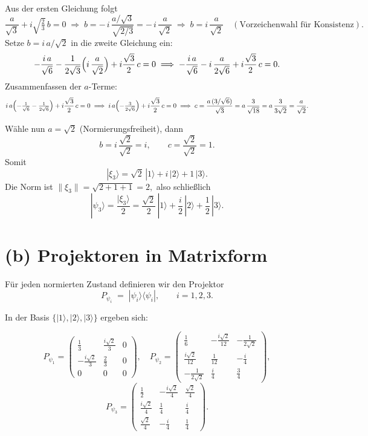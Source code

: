 \documentclass[11pt]{scrartcl}
\begin{document}
\begin{enumerate}[label=\arabic*)]
    Aus der ersten Gleichung folgt
    \[
      \frac{a}{\sqrt3} + i\sqrt{\tfrac23}\,b = 0
      \;\Longrightarrow\;
      b = -\,i\,\frac{a/\sqrt3}{\sqrt{2/3}}
          = -\,i\,\frac{a}{\sqrt2}
      \;\Longrightarrow\;
      b = i\,\frac{a}{\sqrt2}\quad(\text{Vorzeichenwahl für Konsistenz}).
    \]
    Setze $b= i\,a/\sqrt2$ in die zweite Gleichung ein:
    \[
      -\frac{i\,a}{\sqrt6}
      - \frac{1}{2\sqrt3}\Bigl(i\,\frac{a}{\sqrt2}\Bigr)
      + i\frac{\sqrt3}{2}\,c = 0
      \;\Longrightarrow\;
      -\frac{i\,a}{\sqrt6}
      - i\,\frac{a}{2\sqrt6}
      + i\frac{\sqrt3}{2}\,c = 0.
    \]
    Zusammenfassen der $a$-Terme:
    \[
      i\,a\Bigl(-\tfrac{1}{\sqrt6} - \tfrac{1}{2\sqrt6}\Bigr)
      + i\frac{\sqrt3}{2}\,c = 0
      \;\Longrightarrow\;
      i\,a\Bigl(-\tfrac{3}{2\sqrt6}\Bigr)
      + i\frac{\sqrt3}{2}\,c = 0
      \;\Longrightarrow\;
      c = \frac{a\,(3/\sqrt6)}{\sqrt3}
        = a\,\frac{3}{\sqrt{18}}
        = a\,\frac{3}{3\sqrt2}
        = \frac{a}{\sqrt2}.
    \]

    Wähle nun $a=\sqrt2$ (Normierungsfreiheit), dann
    \[
      b = i\,\frac{\sqrt2}{\sqrt2} = i,
      \qquad
      c = \frac{\sqrt2}{\sqrt2} = 1.
    \]
    Somit
    \[
      |\xi_3\rangle = \sqrt2\,|1\rangle + i\,|2\rangle + 1\,|3\rangle.
    \]
    Die Norm ist
    \(\|\xi_3\| = \sqrt{2 + 1 + 1} = 2,\)
    also schließlich
    \[
      |\psi_3\rangle
      = \frac{|\xi_3\rangle}{2}
      = \frac{\sqrt2}{2}\,|1\rangle + \frac{i}{2}\,|2\rangle + \frac12\,|3\rangle.
    \]
\end{enumerate}

\bigskip

\section*{(b) Projektoren in Matrixform}

Für jeden normierten Zustand definieren wir den Projektor
\[
  P_{\psi_i} \;=\; |\psi_i\rangle\langle\psi_i|,\qquad i=1,2,3.
\]

In der Basis \(\{|1\rangle,|2\rangle,|3\rangle\}\) ergeben sich:

\[
P_{\psi_1}
= \begin{pmatrix}
\frac13 & \frac{i\sqrt2}{3} & 0 \\[4pt]
-\frac{i\sqrt2}{3} & \frac23 & 0 \\[4pt]
0 & 0 & 0
\end{pmatrix},\quad
P_{\psi_2}
= \begin{pmatrix}
\frac16 & -\frac{i\sqrt2}{12} & -\frac{1}{2\sqrt2} \\[4pt]
\frac{i\sqrt2}{12} & \frac1{12} & -\frac{i}{4} \\[4pt]
-\frac{1}{2\sqrt2} & \frac{i}{4} & \frac34
\end{pmatrix},
\]
\[
P_{\psi_3}
= \begin{pmatrix}
\frac12 & -\frac{i\sqrt2}{4} & \frac{\sqrt2}{4} \\[4pt]
\frac{i\sqrt2}{4} & \frac14 & \frac{i}{4} \\[4pt]
\frac{\sqrt2}{4} & -\frac{i}{4} & \frac14
\end{pmatrix}.
\]
\end{document}
